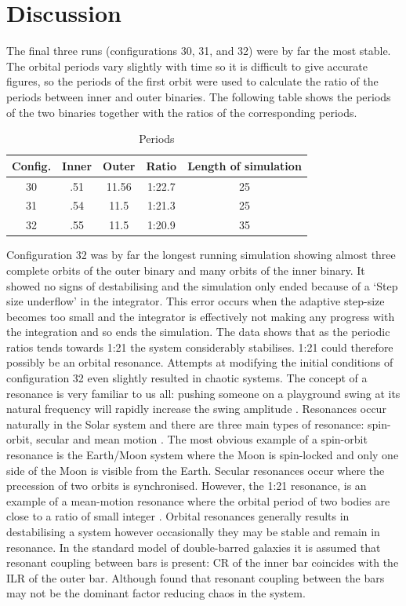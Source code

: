 \documentclass[a4paper,12pt]{article}
\begin{document}
\newpage
\section{Discussion}
The final three runs (configurations 30, 31, and 32) were by far the most stable. The orbital periods vary slightly with time so it is difficult to give accurate figures, so the 
periods of the first orbit were used to calculate the ratio of the periods between inner and outer binaries. The following table shows the periods of the two binaries together with the ratios of the corresponding periods.
\begin{table}[ht!]
  \centering
  \caption{Periods}
  \label{tab:periods}
  \begin{tabular}{ccccc}
   Config. & Inner & Outer & Ratio & Length of simulation\\
    \hline
   30 & .51 & 11.56 & 1:22.7 & 25\\
   31 & .54 & 11.5 & 1:21.3 & 25\\
   32 & .55 & 11.5 & 1:20.9 & 35\\
  \end{tabular}
\end{table}

Configuration 32 was by far the longest running simulation showing almost three complete orbits of the outer binary and many orbits of the inner binary. It showed no signs of destabilising and the 
simulation only ended because of a `Step size underflow' in the integrator. This error occurs when the adaptive step-size becomes too small and the integrator is effectively not making any
progress with the integration and so ends the simulation. The data shows that as the periodic ratios tends towards 1:21 the system considerably stabilises. 1:21 could therefore possibly be an orbital resonance. 
Attempts at modifying the initial conditions of configuration 32 even slightly resulted in chaotic systems. The concept of a resonance is very familiar to us all: pushing someone on a playground swing at its natural
frequency will rapidly increase the swing amplitude \citep{malhotra}. Resonances occur naturally in the Solar system and there are three main types of resonance: spin-orbit, secular and mean motion \citep{malhotra}.
The most obvious example of a spin-orbit resonance is the Earth/Moon system where the Moon is spin-locked and only one side of the Moon is visible from the Earth. Secular resonances occur where the precession of two
orbits is synchronised. However, the 1:21 resonance, is an example of a mean-motion resonance where the orbital period of two bodies are close to a ratio of small integer \citep{malhotra}. Orbital resonances
generally results in destabilising a system however occasionally they may be stable and remain in resonance.
In the standard model of double-barred galaxies \citep{macie7} it is assumed that resonant coupling between bars is present: CR of the inner bar coincides with the ILR of the outer bar. Although \cite{macie4} 
found that resonant coupling between the bars may not be the dominant factor reducing chaos in the system.
\end{document}
